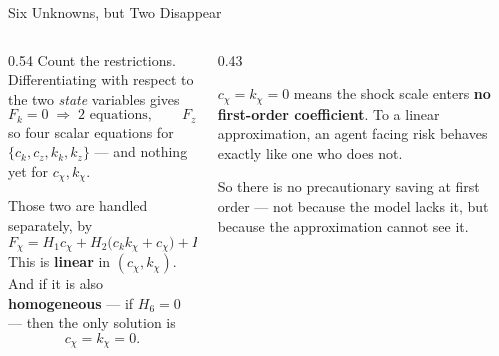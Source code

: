 \begin{frame}{Six Unknowns, but Two Disappear}
\begin{columns}[T]
\begin{column}{0.54\textwidth}
\small
Count the restrictions. Differentiating with respect to the two \emph{state} variables gives
\[
  F_k=0 \;\Rightarrow\; 2 \text{ equations},\qquad
  F_z=0 \;\Rightarrow\; 2 \text{ equations},
\]
so four scalar equations for $\{c_k,c_z,k_k,k_z\}$ --- and nothing yet for $c_\chi,k_\chi$.
\medskip

Those two are handled separately, by
\[
  F_{\chi}=H_{1}c_{\chi}+H_{2}\big(c_{k}k_{\chi}+c_{\chi}\big)+H_{4}k_{\chi}+H_{6}=0 .
\]
This is \textbf{linear} in $(c_\chi,k_\chi)$. And if it is also \textbf{homogeneous} --- if $H_6=0$ --- then the only solution is
\[
  c_{\chi}=k_{\chi}=0 .
\]
\end{column}
\begin{column}{0.43\textwidth}
\begin{takeawaybox}[title=\textbf{Certainty equivalence}]\small
$c_\chi=k_\chi=0$ means the shock scale enters \textbf{no first-order coefficient}. To a linear approximation, an agent facing risk behaves exactly like one who does not.
\end{takeawaybox}
\medskip
\begin{examplebox}\footnotesize
So there is no precautionary saving at first order --- not because the model lacks it, but because the approximation cannot see it.
\end{examplebox}
\end{column}
\end{columns}
\vspace{1mm}
\end{frame}

